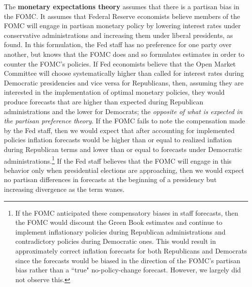 \documentclass[a4paper]{article}\usepackage{graphicx, color}
\begin{document}
The {\bf{monetary expectations theory}} assumes that there is a partisan bias in the FOMC. It assumes that Federal Reserve economists believe members of the FOMC will engage in partisan monetary policy by lowering interest rates under conservative administrations and increasing them under liberal presidents, as \cite{Clark2012} found. In this formulation, the Fed staff has no preference for one party over another, but knows that the FOMC does and so formulates estimates in order to counter the FOMC's policies. If Fed economists believe that the Open Market Committee will choose systematically higher than called for interest rates during Democratic presidencies and vice versa for Republicans, then, assuming they are interested in the implementation of optimal monetary policies, they would produce forecasts that are higher than expected during Republican administrations and the lower for Democrats; the {\emph{opposite of what is expected in the partisan preference theory}}. If the FOMC fails to note the compensation made by the Fed staff, then we would expect that after accounting for implemented policies inflation forecasts would be higher than or equal to realized inflation during Republican terms and lower than or equal to forecasts under Democratic administrations.\footnote{If the FOMC anticipated these compensatory biases in staff forecasts, then the FOMC would discount the Green Book estimates and continue to implement inflationary policies during Republican administrations and contradictory policies during Democratic ones. This would result in approximately correct inflation forecasts for both Republicans and Democrats since the forecasts would be biased in the direction of the FOMC's partisan bias rather than a ``true" no-policy-change forecast. However, we largely did not observe this.} If the Fed staff believes that the FOMC will engage in this behavior only when presidential elections are approaching, then we would expect no partisan differences in forecasts at the beginning of a presidency but increasing divergence as the term wanes.
 
\end{document}
